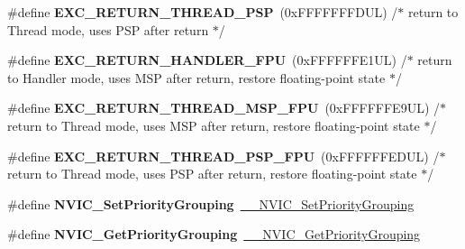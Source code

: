 \begin{DoxyCompactItemize}
\#define {\bfseries E\+X\+C\+\_\+\+R\+E\+T\+U\+R\+N\+\_\+\+T\+H\+R\+E\+A\+D\+\_\+\+P\+SP}~(0x\+F\+F\+F\+F\+F\+F\+F\+D\+U\+L)     /$\ast$ return to Thread mode, uses P\+S\+P after return                                $\ast$/
\item 
\mbox{\label{group___c_m_s_i_s___core___n_v_i_c_functions_ga3aa6648e1c3c09fbab1f543b9dcffc3a}} 
\#define {\bfseries E\+X\+C\+\_\+\+R\+E\+T\+U\+R\+N\+\_\+\+H\+A\+N\+D\+L\+E\+R\+\_\+\+F\+PU}~(0x\+F\+F\+F\+F\+F\+F\+E1\+U\+L)     /$\ast$ return to Handler mode, uses M\+S\+P after return, restore floating-\/point state $\ast$/
\item 
\mbox{\label{group___c_m_s_i_s___core___n_v_i_c_functions_gaad4cb3b34fd4264ccfae1fbbc75a3431}} 
\#define {\bfseries E\+X\+C\+\_\+\+R\+E\+T\+U\+R\+N\+\_\+\+T\+H\+R\+E\+A\+D\+\_\+\+M\+S\+P\+\_\+\+F\+PU}~(0x\+F\+F\+F\+F\+F\+F\+E9\+U\+L)     /$\ast$ return to Thread mode, uses M\+S\+P after return, restore floating-\/point state  $\ast$/
\item 
\mbox{\label{group___c_m_s_i_s___core___n_v_i_c_functions_gadd2299e1d3a79c90b610c6b6f4cadb95}} 
\#define {\bfseries E\+X\+C\+\_\+\+R\+E\+T\+U\+R\+N\+\_\+\+T\+H\+R\+E\+A\+D\+\_\+\+P\+S\+P\+\_\+\+F\+PU}~(0x\+F\+F\+F\+F\+F\+F\+E\+D\+U\+L)     /$\ast$ return to Thread mode, uses P\+S\+P after return, restore floating-\/point state  $\ast$/
\item 
\mbox{\label{group___c_m_s_i_s___core___n_v_i_c_functions_ga0e798d5aec68cdd8263db86a76df788f}} 
\#define {\bfseries N\+V\+I\+C\+\_\+\+Set\+Priority\+Grouping}~\mbox{\hyperlink{group___c_m_s_i_s___core___n_v_i_c_functions_gafc94dcbaee03e4746ade1f5bb9aaa56d}{\+\_\+\+\_\+\+N\+V\+I\+C\+\_\+\+Set\+Priority\+Grouping}}
\item 
\mbox{\label{group___c_m_s_i_s___core___n_v_i_c_functions_ga4eeb9214f2264fc23c34ad5de2d3fa11}} 
\#define {\bfseries N\+V\+I\+C\+\_\+\+Get\+Priority\+Grouping}~\mbox{\hyperlink{group___c_m_s_i_s___core___n_v_i_c_functions_ga9b894af672df4373eb637f8288845c05}{\+\_\+\+\_\+\+N\+V\+I\+C\+\_\+\+Get\+Priority\+Grouping}}
\item 

\end{DoxyCompactItemize}
